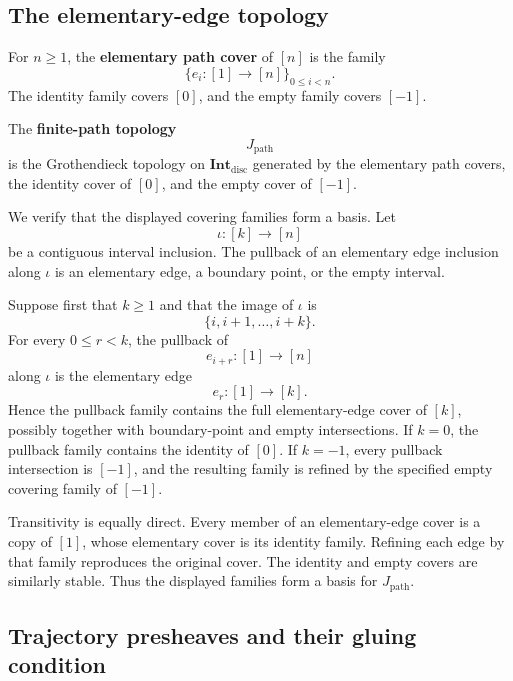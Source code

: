 \subsection{The elementary-edge topology}
\label{subsec:path-topology}

\begin{definition}
\label{def:elementary-path-covers}
For \(n\geq1\), the \textbf{elementary path cover} of \([n]\) is the family
\[
    \{e_i:[1]\to[n]\}_{0\leq i<n}.
\]
The identity family covers \([0]\), and the empty family covers \([-1]\).
\end{definition}

\begin{definition}
\label{def:discrete-path-topology}
The \textbf{finite-path topology}
\[
    J_{\mathrm{path}}
\]
is the Grothendieck topology on \(\mathbf{Int}_{\mathrm{disc}}\) generated by
the elementary path covers, the identity cover of \([0]\), and the empty
cover of \([-1]\).
\end{definition}

We verify that the displayed covering families form a basis. Let
\[
    \iota:[k]\to[n]
\]
be a contiguous interval inclusion. The pullback of an elementary edge
inclusion along \(\iota\) is an elementary edge, a boundary point, or the
empty interval.

Suppose first that \(k\geq1\) and that the image of \(\iota\) is
\[
    \{i,i+1,\ldots,i+k\}.
\]
For every \(0\leq r<k\), the pullback of
\[
    e_{i+r}:[1]\to[n]
\]
along \(\iota\) is the elementary edge
\[
    e_r:[1]\to[k].
\]
Hence the pullback family contains the full elementary-edge cover of
\([k]\), possibly together with boundary-point and empty intersections. If
\(k=0\), the pullback family contains the identity of \([0]\). If
\(k=-1\), every pullback intersection is \([-1]\), and the resulting family
is refined by the specified empty covering family of \([-1]\).

Transitivity is equally direct. Every member of an elementary-edge cover is a
copy of \([1]\), whose elementary cover is its identity family. Refining
each edge by that family reproduces the original cover. The identity and
empty covers are similarly stable. Thus the displayed families form a basis
for \(J_{\mathrm{path}}\).

\subsection{Trajectory presheaves and their gluing condition}
\label{subsec:concrete-path-sheaf-condition}

